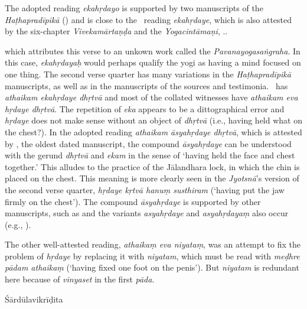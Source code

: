 \begin{ekdosis}
\begin{testimonia}[hp01_035]
\end{testimonia}

\begin{philcomm}[hp01_035]

The adopted reading \emph{ekahṛdayo} is  supported by two manuscripts of the \emph{Haṭhapradīpikā} () and is close to the \textalpha\ reading \emph{ekahṛdaye}, which is also attested by the six-chapter \emph{Viveka\-mārtaṇḍa} and the \emph{Yoga\-cintāmaṇi}, ..

which attributes this verse to an unkown work called the \emph{Pavanayogasaṅgraha}. In this case, \emph{ekahṛdayaḥ} would perhaps qualify the yogi as having a mind focused on one thing. 
The second verse quarter has many variations in the \emph{Haṭhapradīpikā} manuscripts, as well as in the manuscripts of the sources and testimonia. \alphaOne\ has \emph{athaikam ekahṛdaye dhṛtvā} and most of the collated witnesses have \emph{athaikam eva hṛdaye dhṛtvā}. The repetition of \emph{eka} appears to be a dittographical error and \emph{hṛdaye} does not make sense without an object of \emph{dhṛtvā} (i.e., having held what on the chest?). In the adopted reading \emph{athaikam āsyahṛdaye dhṛtvā}, which is attested by \etaOne, the oldest dated manuscript, the compound \emph{āsyahṛdaye} can be understood with the gerund \emph{dhṛtvā} and \emph{ekam} in the sense of `having held the face and chest together.' This alludes to the practice of the Jālandhara lock, in which the chin is placed on the chest. This meaning is more clearly seen in the \emph{Jyotsnā}'s version of the second verse quarter, \emph{hṛdaye kṛtvā hanuṃ susthiram} (`having put the jaw firmly on the chest'). The compound \emph{āsyahṛdaye} is supported by other manuscripts, such as  and the variants \emph{asyahṛdaye} and \emph{asyahṛdayaṃ} also occur (e.g., ). 

The other well-attested reading, \emph{athaikaṃ eva niyataṃ}, was an attempt to fix the problem of \emph{hṛdaye} by replacing it with \emph{niyatam}, which must be read with \emph{meḍhre pādam athaikaṃ} (`having fixed one foot on the penis'). But \emph{niyatam} is redundant here because of \emph{vinyaset} in the first \emph{pāda}.     

\end{philcomm}

\begin{metre}[hp01_035]
Śārdūlavikrīḍita 
\end{metre}


\end{ekdosis}
